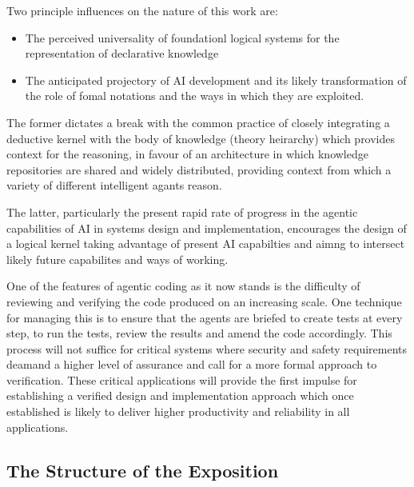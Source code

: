 \documentclass[sigplan,10pt,anonymous,review]{acmart}
\begin{document}
Two principle influences on the nature of this work are:
\begin{itemize}
\item The perceived universality of foundationl logical systems for the representation of declarative knowledge
\item The anticipated projectory of AI development and its likely transformation of the role of fomal notations and the ways in which they are exploited. 
\end{itemize}

The former dictates a break with the common practice of closely integrating a deductive kernel
with the body of knowledge (theory heirarchy) which provides context for the reasoning,
in favour of an architecture in which knowledge repositories are shared and widely distributed,
providing context from which a variety of different intelligent agants reason.

The latter, particularly the present rapid rate of progress in the agentic capabilities of
AI in systems design and implementation,
encourages the design of a logical kernel taking advantage of present AI capabilties
and aimng to intersect likely future capabilites and ways of working.

One of the features of agentic coding as it now stands is the difficulty of reviewing and verifying
the code produced on an increasing scale.
One technique for managing this is to ensure that the agents are briefed to create tests at every step,
to run the tests, review the results and amend the code accordingly.
This process will not suffice for critical systems where security and safety requirements deamand
a higher level of assurance and call for a more formal approach to verification.
These critical applications will provide the first impulse for establishing a
verified design and implementation approach which once established is likely to
deliver higher productivity and reliability in all applications.

\subsection{The Structure of the Exposition}
\end{document}
